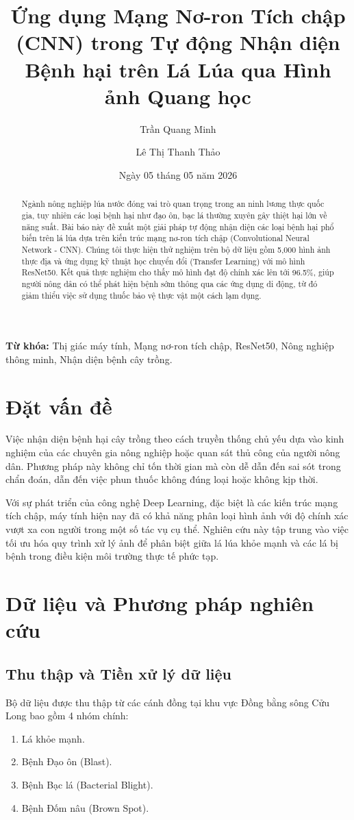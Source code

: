 \documentclass[11pt,a4paper]{article}
\title{\textbf{Ứng dụng Mạng Nơ-ron Tích chập (CNN) trong Tự động Nhận diện Bệnh hại trên Lá Lúa qua Hình ảnh Quang học}}
\author[1]{Trần Quang Minh}
\author[2]{Lê Thị Thanh Thảo}
\affil[1,2]{Viện Nghiên cứu Trí tuệ Nhân tạo, Đại học Công nghệ}
\affil[ ]{Email: {minhtq, thaoltt}@vnu.edu.vn}
\date{Ngày 05 tháng 05 năm 2026}
\begin{document}
\maketitle

\begin{abstract}
Ngành nông nghiệp lúa nước đóng vai trò quan trọng trong an ninh lương thực quốc gia, tuy nhiên các loại bệnh hại như đạo ôn, bạc lá thường xuyên gây thiệt hại lớn về năng suất. Bài báo này đề xuất một giải pháp tự động nhận diện các loại bệnh hại phổ biến trên lá lúa dựa trên kiến trúc mạng nơ-ron tích chập (Convolutional Neural Network - CNN). Chúng tôi thực hiện thử nghiệm trên bộ dữ liệu gồm 5,000 hình ảnh thực địa và ứng dụng kỹ thuật học chuyển đổi (Transfer Learning) với mô hình ResNet50. Kết quả thực nghiệm cho thấy mô hình đạt độ chính xác lên tới 96.5\%, giúp người nông dân có thể phát hiện bệnh sớm thông qua các ứng dụng di động, từ đó giảm thiểu việc sử dụng thuốc bảo vệ thực vật một cách lạm dụng.
\end{abstract}

\textbf{Từ khóa:} Thị giác máy tính, Mạng nơ-ron tích chập, ResNet50, Nông nghiệp thông minh, Nhận diện bệnh cây trồng.

\section{Đặt vấn đề}
Việc nhận diện bệnh hại cây trồng theo cách truyền thống chủ yếu dựa vào kinh nghiệm của các chuyên gia nông nghiệp hoặc quan sát thủ công của người nông dân. Phương pháp này không chỉ tốn thời gian mà còn dễ dẫn đến sai sót trong chẩn đoán, dẫn đến việc phun thuốc không đúng loại hoặc không kịp thời.

Với sự phát triển của công nghệ Deep Learning, đặc biệt là các kiến trúc mạng tích chập, máy tính hiện nay đã có khả năng phân loại hình ảnh với độ chính xác vượt xa con người trong một số tác vụ cụ thể. Nghiên cứu này tập trung vào việc tối ưu hóa quy trình xử lý ảnh để phân biệt giữa lá lúa khỏe mạnh và các lá bị bệnh trong điều kiện môi trường thực tế phức tạp.

\section{Dữ liệu và Phương pháp nghiên cứu}
\subsection{Thu thập và Tiền xử lý dữ liệu}
Bộ dữ liệu được thu thập từ các cánh đồng tại khu vực Đồng bằng sông Cửu Long bao gồm 4 nhóm chính: 
\begin{enumerate}
    \item Lá khỏe mạnh.
    \item Bệnh Đạo ôn (Blast).
    \item Bệnh Bạc lá (Bacterial Blight).
    \item Bệnh Đốm nâu (Brown Spot).
\end{enumerate}
\end{document}
